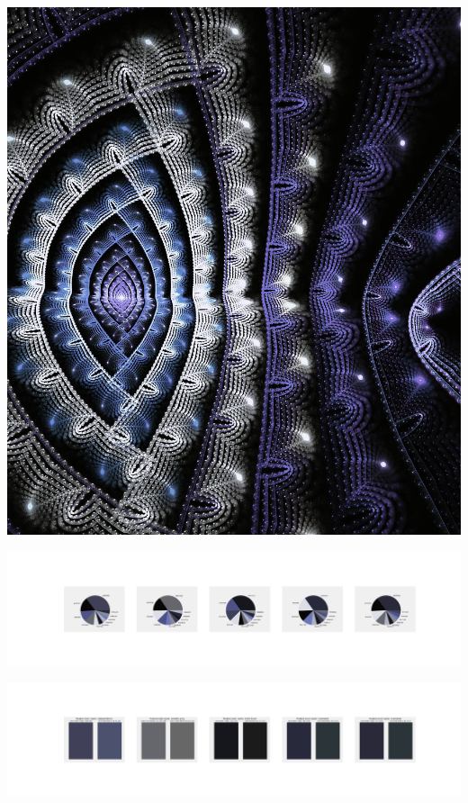 \documentclass[11pt]{article}
\begin{document}
\begin{landscape}
    \begin{center}
    \includegraphics[width=\textwidth]{./nbimg/file (121).jpg}
    \end{center}

    \begin{center}
    \includegraphics[width=250mm]{./nbimg/pie-25.jpg}
    \end{center}

    \begin{center}
    \includegraphics[width=250mm]{./nbimg/peak-25.jpg}
    \end{center}
    


\end{landscape}
\end{document}
